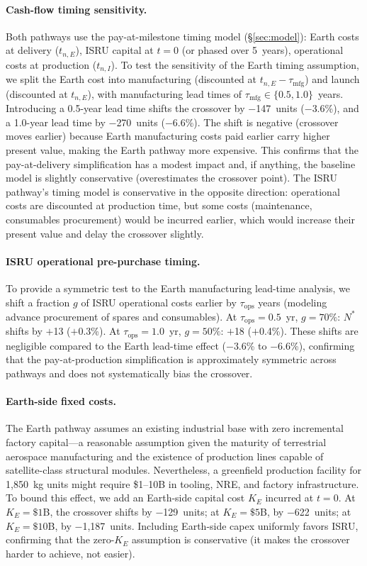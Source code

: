 \documentclass[preprint,12pt]{elsarticle}
\begin{document}
\paragraph{Cash-flow timing sensitivity.} Both pathways use the pay-at-milestone timing model (\S\ref{sec:model}): Earth costs at delivery ($t_{n,E}$), ISRU capital at $t = 0$ (or phased over 5~years), operational costs at production ($t_{n,I}$). To test the sensitivity of the Earth timing assumption, we split the Earth cost into manufacturing (discounted at $t_{n,E} - \tau_{\mathrm{mfg}}$) and launch (discounted at $t_{n,E}$), with manufacturing lead times of $\tau_{\mathrm{mfg}} \in \{0.5, 1.0\}$~years. Introducing a 0.5-year lead time shifts the crossover by $-$147~units ($-$3.6\%), and a 1.0-year lead time by $-$270~units ($-$6.6\%). The shift is negative (crossover moves earlier) because Earth manufacturing costs paid earlier carry higher present value, making the Earth pathway more expensive. This confirms that the pay-at-delivery simplification has a modest impact and, if anything, the baseline model is slightly conservative (overestimates the crossover point). The ISRU pathway's timing model is conservative in the opposite direction: operational costs are discounted at production time, but some costs (maintenance, consumables procurement) would be incurred earlier, which would increase their present value and delay the crossover slightly.

\paragraph{ISRU operational pre-purchase timing.} To provide a symmetric test to the Earth manufacturing lead-time analysis, we shift a fraction $g$ of ISRU operational costs earlier by $\tau_{\mathrm{ops}}$ years (modeling advance procurement of spares and consumables). At $\tau_{\mathrm{ops}} = 0.5$~yr, $g = 70\%$: $N^*$ shifts by $+$13 ($+$0.3\%). At $\tau_{\mathrm{ops}} = 1.0$~yr, $g = 50\%$: $+$18 ($+$0.4\%). These shifts are negligible compared to the Earth lead-time effect ($-$3.6\% to $-$6.6\%), confirming that the pay-at-production simplification is approximately symmetric across pathways and does not systematically bias the crossover.

\paragraph{Earth-side fixed costs.} The Earth pathway assumes an existing industrial base with zero incremental factory capital---a reasonable assumption given the maturity of terrestrial aerospace manufacturing and the existence of production lines capable of satellite-class structural modules. Nevertheless, a greenfield production facility for 1{,}850~kg units might require \$1--10B in tooling, NRE, and factory infrastructure. To bound this effect, we add an Earth-side capital cost $K_E$ incurred at $t = 0$. At $K_E = \$1$B, the crossover shifts by $-$129~units; at $K_E = \$5$B, by $-$622~units; at $K_E = \$10$B, by $-$1{,}187~units. Including Earth-side capex uniformly favors ISRU, confirming that the zero-$K_E$ assumption is conservative (it makes the crossover harder to achieve, not easier).
\end{document}
